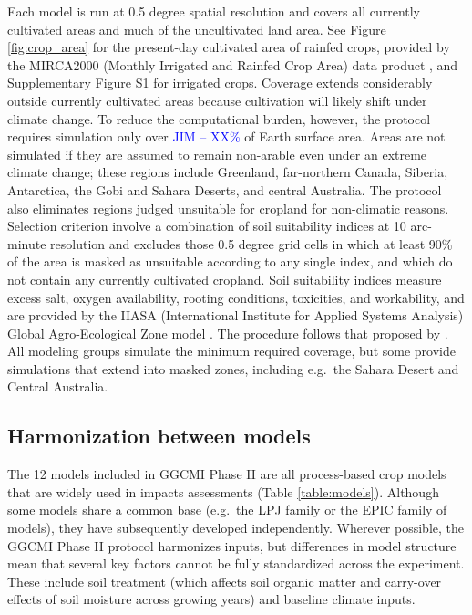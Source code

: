 \documentclass[gmd, manuscript]{copernicus} %
\begin{document}
Each model is run at 0.5 degree spatial resolution and covers all currently cultivated areas and much of the uncultivated land area. See Figure \ref{fig:crop_area} for the present-day cultivated area of rainfed crops, provided by the MIRCA2000 (Monthly Irrigated and Rainfed Crop Area) data product \citep{Portmann2010}, and Supplementary Figure S1 for irrigated crops. 
Coverage extends considerably outside currently cultivated areas because cultivation will likely shift under climate change.  
To reduce the computational burden, however, the protocol requires simulation only over \textcolor{blue}{JIM -- XX\%} of Earth surface area.  
Areas are not simulated if they are assumed to remain non-arable even under an extreme climate change; these regions include Greenland, far-northern Canada, Siberia, Antarctica, the Gobi and Sahara Deserts, and central Australia. 
The protocol also eliminates regions judged unsuitable for cropland for non-climatic reasons. 
Selection criterion involve a combination of soil suitability indices at 10 arc-minute resolution and excludes those 0.5 degree grid cells in which at least 90\% of the area is masked as unsuitable according to any single index, and which do not contain any currently cultivated cropland. 
Soil suitability indices measure excess salt, oxygen availability, rooting conditions, toxicities, and workability, and are provided by the IIASA (International Institute for Applied Systems Analysis) Global Agro-Ecological Zone model \citep[GAEZ, ][]{gaez}. 
The procedure follows that proposed by \citet{pugh_climate_2016}. 
All modeling groups simulate the minimum required coverage, but some provide simulations that extend into masked zones, including e.g.\ the Sahara Desert and Central Australia.

\subsection{Harmonization between models}
The 12 models included in GGCMI Phase II are all process-based crop models that are widely used in impacts assessments (Table \ref{table:models}).
Although some models share a common base (e.g.\ the LPJ family or the EPIC family of models), they have subsequently developed independently.  Wherever possible, the GGCMI Phase II protocol harmonizes inputs, but
differences in model structure mean that several key factors cannot be fully standardized across the experiment. These include soil treatment (which affects soil organic matter and carry-over effects of soil moisture across growing years) and baseline climate inputs.  
\end{document}
